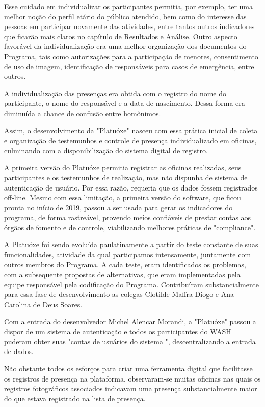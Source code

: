 Esse cuidado em individualizar os participantes permitia, por exemplo, ter uma melhor noção do perfil etário do público atendido, bem como do interesse das pessoas em participar novamente das atividades, entre tantos outros indicadores que ficarão mais claros no capítulo de Resultados e Análise. Outro aspecto favorável da individualização era uma melhor organização dos documentos do Programa, tais como autorizações para a participação de menores, consentimento de uso de imagem, identificação de responsáveis para casos de emergência, entre outros.

A individualização das presenças era obtida com o registro do nome do participante, o nome do responsável e a data de nascimento. Dessa forma era diminuída a chance de confusão entre homônimos.

Assim, o desenvolvimento da "Platuóxe" nasceu com essa prática inicial de coleta e organização de testemunhos e controle de presença individualizado em oficinas, culminando com a disponibilização do sistema digital de registro.

A primeira versão do Platuóxe permitia registrar as oficinas realizadas, seus participantes e os testemunhos de realização, mas não dispunha de sistema de autenticação de usuário. Por essa razão, requeria que os dados fossem registrados off-line. Mesmo com essa limitação, a primeira versão do software, que ficou pronta no início de 2019, passou a ser usada para gerar os indicadores do programa, de forma rastreável, provendo meios confiáveis de prestar contas aos órgãos de fomento e de controle, viabilizando melhores práticas de "compliance".

A Platuóxe foi sendo evoluída paulatinamente a partir do teste constante de suas funcionalidades, atividade da qual participamos intensamente, juntamente com outros membros do Programa. A cada teste, eram identificados os problemas, com a subsequente propostas de alternativas, que eram implementadas pela equipe responsável pela codificação do Programa. Contribuíram substancialmente para essa fase de desenvolvimento as colegas Clotilde Maffra Diogo e Ana Carolina de Deus Soares.

Com a entrada do desenvolvedor Michel Alencar Morandi, a "Platuóxe" passou a dispor de um sistema de autenticação e todos os participantes do WASH puderam obter suas "contas de usuários do sistema ", descentralizando a entrada de dados.

Não obstante todos os esforços para criar uma ferramenta digital que facilitasse os registros de presença na plataforma, observaram-se muitas oficinas nas quais os registros fotográficos associados indicavam uma presença substancialmente maior do que estava registrado na lista de presença.


